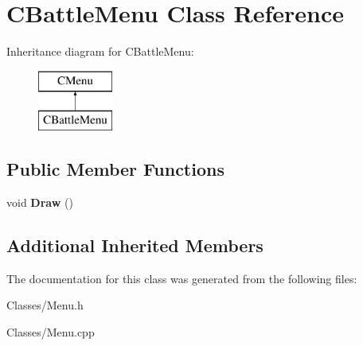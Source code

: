 \hypertarget{class_c_battle_menu}{}\section{C\+Battle\+Menu Class Reference}
\label{class_c_battle_menu}
Inheritance diagram for C\+Battle\+Menu\+:\begin{figure}[H]
\begin{center}
\leavevmode
\includegraphics[height=2.000000cm]{class_c_battle_menu}
\end{center}
\end{figure}
\subsection*{Public Member Functions}
\begin{DoxyCompactItemize}
\item 
void {\bfseries Draw} ()\hypertarget{class_c_battle_menu_acf8df72fe00b1c74b08617cdd4d7a620}{}\label{class_c_battle_menu_acf8df72fe00b1c74b08617cdd4d7a620}

\end{DoxyCompactItemize}
\subsection*{Additional Inherited Members}


The documentation for this class was generated from the following files\+:\begin{DoxyCompactItemize}
\item 
Classes/Menu.\+h\item 
Classes/Menu.\+cpp\end{DoxyCompactItemize}

